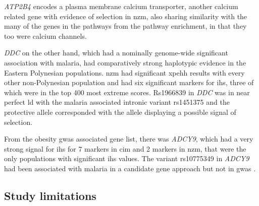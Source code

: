 \documentclass[]{report}
\begin{document}
\emph{ATP2B4} encodes a plasma membrane calcium transporter, another
calcium related gene with evidence of selection in \gls{nzm}, also
sharing similarity with the many of the genes in the pathways from the
pathway enrichment, in that they too were calcium channels.

\emph{DDC} on the other hand, which had a nominally genome-wide
significant association with malaria, had comparatively strong
haplotypic evidence in the Eastern Polynesian populations. \Gls{nzm} had
significant \gls{xpehh} results with every other non-Polynesian
population and had six significant markers for \gls{ihs}, three of which
were in the top 400 most extreme scores. Rs1966839 in \emph{DDC} was in
near perfect \gls{ld} with the malaria associated intronic variant
rs1451375 \citep{jallow2009genome} and the protective allele
corresponded with the allele displaying a possible signal of selection.

From the obesity \gls{gwas} associated gene list, there was
\emph{ADCY9}, which had a very strong signal for \gls{ihs} for 7 markers
in \gls{cim} and 2 markers in \gls{nzm}, that were the only populations
with significant \gls{ihs} values. The variant rs10775349 in
\emph{ADCY9} had been associated with malaria in a candidate gene
approach but not in \gls{gwas} \citep{Maiga2013}.

\subsection{Study limitations}\label{chap3limit}
\end{document}
